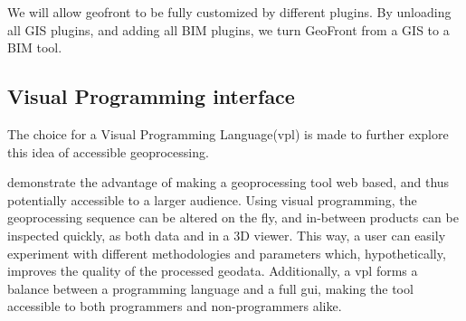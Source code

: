 We will allow geofront to be fully customized by different plugins. By unloading all GIS plugins, and adding all BIM plugins, we turn GeoFront from a GIS to a BIM tool.











\subsection{Visual Programming interface}

The choice for a Visual Programming Language(vpl) is made to further explore this idea of accessible geoprocessing. 

demonstrate the advantage of making a geoprocessing tool web based, and thus potentially accessible to a larger audience. 
Using visual programming, the geoprocessing sequence can be altered on the fly, and in-between products can be inspected quickly, as both data and in a 3D viewer. 
This way, a user can easily experiment with different methodologies and parameters which, hypothetically, improves the quality of the processed geodata.
Additionally, a vpl forms a balance between a programming language and a full gui, making the tool accessible to both programmers and non-programmers alike.

